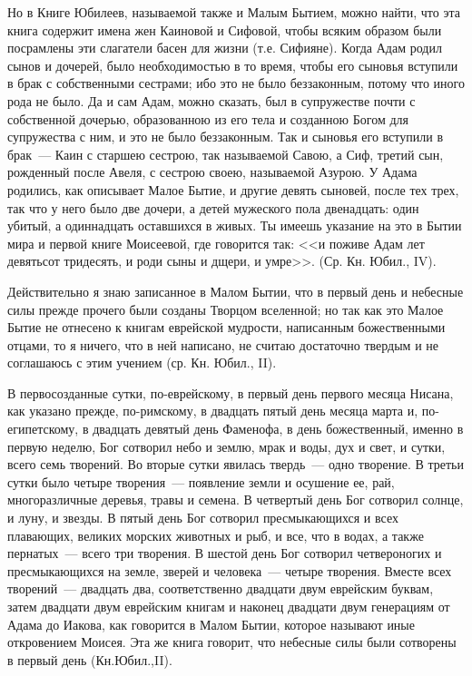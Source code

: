 Но в Книге Юбилеев, называемой также и Малым
Бытием, можно найти, что эта книга содержит имена
жен Каиновой и Сифовой, чтобы всяким образом были
посрамлены эти слагатели басен для жизни (т.е.
Сифияне). Когда Адам родил сынов и дочерей, было
необходимостью в то время, чтобы его сыновья
вступили в брак с собственными сестрами; ибо это
не было беззаконным, потому что иного рода не
было. Да и сам Адам, можно сказать, был в
супружестве почти с собственной дочерью,
образованною из его тела и созданною Богом для
супружества с ним, и это не было беззаконным. Так
и сыновья его вступили в брак~--- Каин с старшею
сестрою, так называемой Савою, а Сиф, третий сын,
рожденный после Авеля, с сестрою своею,
называемой Азурою. У Адама родились, как
описывает Малое Бытие, и другие девять сыновей,
после тех трех, так что у него было две дочери, а
детей мужеского пола двенадцать: один убитый, а
одиннадцать оставшихся в живых. Ты имеешь
указание на это в Бытии мира и первой книге
Моисеевой, где говорится так: <<и поживе Адам
лет девятьсот тридесять, и роди сыны и дщери, и
умре>>. (Ср. Кн. Юбил., IV).

Действительно я знаю записанное в Малом Бытии,
что в первый день и небесные силы прежде прочего
были созданы Творцом вселенной; но так как это
Малое Бытие не отнесено к книгам еврейской
мудрости, написанным божественными отцами, то я
ничего, что в ней написано, не считаю достаточно
твердым и не соглашаюсь с этим учением (ср. Кн. Юбил., II).

В первосозданные сутки, по-еврейскому, в первый
день первого месяца Нисана, как указано прежде,
по-римскому, в двадцать пятый день месяца марта и,
по-египетскому, в двадцать девятый день Фаменофа,
в день божественный, именно в первую неделю, Бог
сотворил небо и землю, мрак и воды, дух и свет, и
сутки, всего семь творений. Во вторые сутки
явилась твердь~--- одно творение. В третьи сутки
было четыре творения~--- появление земли и осушение
ее, рай, многоразличные деревья, травы и семена. В
четвертый день Бог сотворил солнце, и луну, и
звезды. В пятый день Бог сотворил пресмыкающихся
и всех плавающих, великих морских животных и рыб,
и все, что в водах, а также пернатых~--- всего три
творения. В шестой день Бог сотворил
четвероногих и пресмыкающихся на земле, зверей и
человека~--- четыре творения. Вместе всех творений~---
двадцать два, соответственно двадцати двум
еврейским буквам, затем двадцати двум еврейским
книгам и наконец двадцати двум генерациям от
Адама до Иакова, как говорится в Малом Бытии,
которое называют иные откровением Моисея. Эта же
книга говорит, что небесные силы были сотворены в
первый день (Кн.Юбил.,II).

